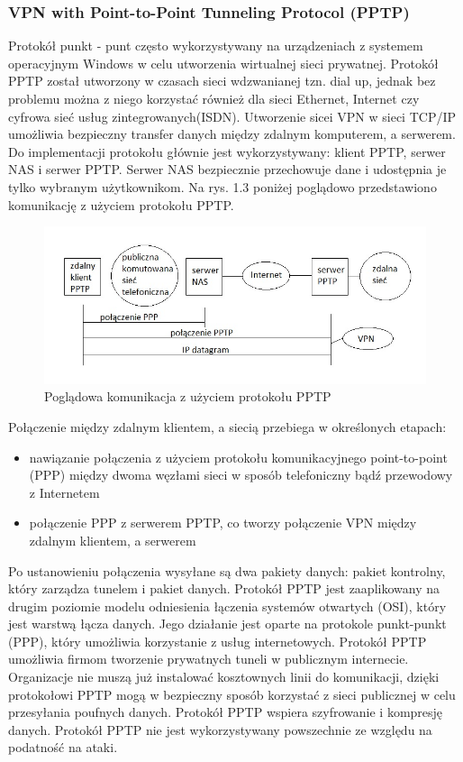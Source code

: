 \documentclass[12p]{article}
\begin{document}
\subsubsection{VPN with Point-to-Point Tunneling Protocol (PPTP)}
\quad Protokół punkt - punt często wykorzystywany na urządzeniach z systemem operacyjnym Windows w celu utworzenia wirtualnej sieci prywatnej. Protokół PPTP został utworzony w czasach sieci wdzwanianej tzn. dial up, jednak bez problemu można z niego korzystać również dla sieci Ethernet, Internet czy cyfrowa sieć usług zintegrowanych(ISDN). Utworzenie sicei VPN w sieci TCP/IP umożliwia bezpieczny transfer danych między zdalnym komputerem, a serwerem. Do implementacji protokołu głównie jest wykorzystywany: klient PPTP, serwer NAS i serwer PPTP. Serwer NAS bezpiecznie przechowuje dane i udostępnia je tylko wybranym użytkownikom. Na rys. 1.3 poniżej poglądowo przedstawiono komunikację z użyciem protokołu PPTP. 
\begin{figure}[h]
\centering
\includegraphics[width=12cm]{komunikacja_PPTP.jpg}
\caption{Poglądowa komunikacja z użyciem protokołu PPTP}
\end{figure}

Połączenie między zdalnym klientem, a siecią przebiega w określonych etapach:
\begin{itemize}
\item nawiązanie połączenia z użyciem protokołu komunikacyjnego point-to-point (PPP) między dwoma węzłami sieci w sposób telefoniczny bądź przewodowy z Internetem
\item połączenie PPP z serwerem PPTP, co tworzy połączenie VPN między zdalnym klientem, a serwerem
\end{itemize}
Po ustanowieniu połączenia wysyłane są dwa pakiety danych: pakiet kontrolny, który zarządza tunelem i pakiet danych. Protokół PPTP jest zaaplikowany na drugim poziomie modelu odniesienia łączenia systemów otwartych (OSI), który jest warstwą łącza danych. Jego działanie jest oparte na protokole punkt-punkt (PPP), który umożliwia korzystanie z usług internetowych. Protokół PPTP umożliwia firmom tworzenie prywatnych tuneli w publicznym internecie. Organizacje nie muszą już instalować kosztownych linii do komunikacji, dzięki protokołowi PPTP mogą w bezpieczny sposób korzystać z sieci publicznej w celu przesyłania poufnych danych. Protokół PPTP wspiera szyfrowanie i kompresję danych. Protokół PPTP nie jest wykorzystywany powszechnie ze względu na podatność na ataki.~\cite{PPTP}
\end{document}
